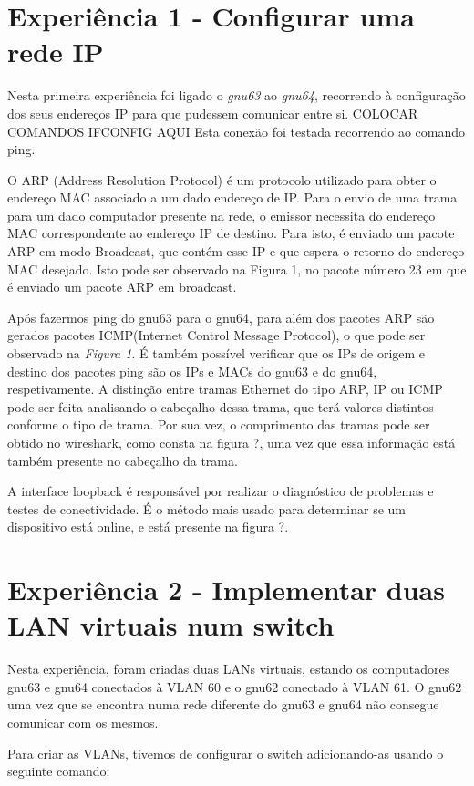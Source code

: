 \documentclass[article, a4paper, 11pt, oneside]{memoir}
\begin{document}
\section{Experiência 1 - Configurar uma rede IP}

Nesta primeira experiência foi ligado o \emph{gnu63} ao \emph{gnu64}, recorrendo à configuração dos seus endereços IP para que pudessem comunicar entre si. 
COLOCAR COMANDOS IFCONFIG AQUI
Esta conexão foi testada recorrendo ao comando ping.

O ARP (Address Resolution Protocol) é um protocolo utilizado para obter o endereço MAC associado
a um dado endereço de IP. Para o envio de uma trama para um dado computador presente na rede, o emissor
necessita do endereço MAC correspondente ao endereço IP de destino. Para isto, é enviado um pacote ARP
em modo Broadcast, que contém esse IP e que espera o retorno do endereço MAC desejado.
Isto pode ser observado na Figura 1, no pacote número 23 em que é enviado um pacote ARP em broadcast.

Após fazermos ping do gnu63 para o gnu64, para além dos pacotes ARP são gerados pacotes ICMP(Internet Control Message Protocol), 
o que pode ser observado na \emph{Figura 1}.
É também possível verificar que os IPs de origem e destino dos pacotes ping são os IPs e MACs do gnu63 e do gnu64, respetivamente.
A distinção entre tramas Ethernet do tipo ARP, IP ou ICMP pode ser feita analisando o cabeçalho dessa trama, que terá valores distintos conforme o tipo de trama.
Por sua vez, o comprimento das tramas pode ser obtido no wireshark, como consta na figura ?, uma vez que essa informação está também presente no cabeçalho da trama.

A interface loopback é responsável por realizar o diagnóstico de problemas e testes de conectividade.
É o método mais usado para determinar se um dispositivo está online, e está presente na figura ?.


\section{Experiência 2 - Implementar duas LAN virtuais num switch}

Nesta experiência, foram criadas duas LANs virtuais, estando os computadores gnu63 e gnu64 conectados à VLAN 60 e o gnu62 conectado à VLAN 61.
O gnu62 uma vez que se encontra numa rede diferente do gnu63 e gnu64 não consegue comunicar com os mesmos.

Para criar as VLANs, tivemos de configurar o switch adicionando-as usando o seguinte comando:
\end{document}
